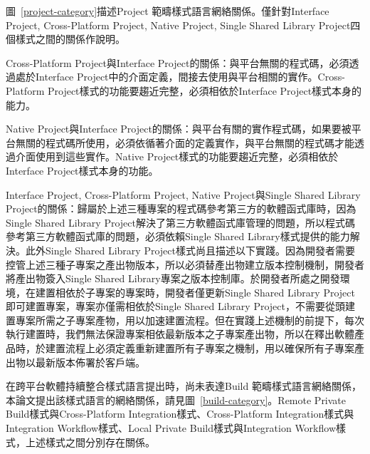 圖~\ref{project-category}描述Project 範疇樣式語言網絡關係。僅針對Interface Project, Cross-Platform Project, Native Project, Single Shared Library Project四個樣式之間的關係作說明。
\begin{description}
\item Cross-Platform Project與Interface Project的關係：與平台無關的程式碼，必須透過處於Interface Project中的介面定義，間接去使用與平台相關的實作。Cross-Platform Project樣式的功能要趨近完整，必須相依於Interface Project樣式本身的能力。
\item Native Project與Interface Project的關係：與平台有關的實作程式碼，如果要被平台無關的程式碼所使用，必須依循著介面的定義實作，與平台無關的程式碼才能透過介面使用到這些實作。Native Project樣式的功能要趨近完整，必須相依於Interface Project樣式本身的功能。
\item Interface Project, Cross-Platform Project, Native Project與Single Shared Library Project的關係：歸屬於上述三種專案的程式碼參考第三方的軟體函式庫時，因為Single Shared Library Project解決了第三方軟體函式庫管理的問題，所以程式碼參考第三方軟體函式庫的問題，必須依賴Single Shared Library樣式提供的能力解決。此外Single Shared Library Project樣式尚且描述以下實踐。因為開發者需要控管上述三種子專案之產出物版本，所以必須替產出物建立版本控制機制，開發者將產出物簽入Single Shared Library專案之版本控制庫。於開發者所處之開發環境，在建置相依於子專案的專案時，開發者僅更新Single Shared Library Project即可建置專案，專案亦僅需相依於Single Shared Library Project，不需要從頭建置專案所需之子專案產物，用以加速建置流程。但在實踐上述機制的前提下，每次執行建置時，我們無法保證專案相依最新版本之子專案產出物，所以在釋出軟體產品時，於建置流程上必須定義重新建置所有子專案之機制，用以確保所有子專案產出物以最新版本佈署於客戶端。
\end{description}

在跨平台軟體持續整合樣式語言提出時，尚未表達Build 範疇樣式語言網絡關係，本論文提出該樣式語言的網絡關係，請見圖~\ref{build-category}。Remote Private Build樣式與Cross-Platform Integration樣式、Cross-Platform Integration樣式與Integration Workflow樣式、Local Private Build樣式與Integration Workflow樣式，上述樣式之間分別存在關係。

